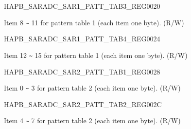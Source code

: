 \begin{register}{H}{APB\_SARADC\_SAR1\_PATT\_TAB3\_REG}{\hexprefix{}0020}\label{regdesc:APBSARADCSAR1PATTTAB3REG}
%
\regnewline%
\begin{regdesc}\begin{reglist}
\label{fielddesc:APBSARADCSAR1PATTTAB3}\item [APB\_SARADC\_SAR1\_PATT\_TAB3] Item 8 \verb+~+ 11 for pattern table 1 (each item one byte). (R/W)
\end{reglist}\end{regdesc}
\end{register}


\begin{register}{H}{APB\_SARADC\_SAR1\_PATT\_TAB4\_REG}{\hexprefix{}0024}\label{regdesc:APBSARADCSAR1PATTTAB4REG}
%
\regnewline%
\begin{regdesc}\begin{reglist}
\label{fielddesc:APBSARADCSAR1PATTTAB4}\item [APB\_SARADC\_SAR1\_PATT\_TAB4] Item 12 \verb+~+ 15 for pattern table 1 (each item one byte). (R/W)
\end{reglist}\end{regdesc}
\end{register}


\begin{register}{H}{APB\_SARADC\_SAR2\_PATT\_TAB1\_REG}{\hexprefix{}0028}\label{regdesc:APBSARADCSAR2PATTTAB1REG}
%
\regnewline%
\begin{regdesc}\begin{reglist}
\label{fielddesc:APBSARADCSAR2PATTTAB1}\item [APB\_SARADC\_SAR2\_PATT\_TAB1] Item 0 \verb+~+ 3 for pattern table 2 (each item one byte). (R/W)
\end{reglist}\end{regdesc}
\end{register}


\begin{register}{H}{APB\_SARADC\_SAR2\_PATT\_TAB2\_REG}{\hexprefix{}002C}\label{regdesc:APBSARADCSAR2PATTTAB2REG}
%
\regnewline%
\begin{regdesc}\begin{reglist}
\label{fielddesc:APBSARADCSAR2PATTTAB2}\item [APB\_SARADC\_SAR2\_PATT\_TAB2] Item 4 \verb+~+ 7 for pattern table 2 (each item one byte). (R/W)
\end{reglist}\end{regdesc}
\end{register}


